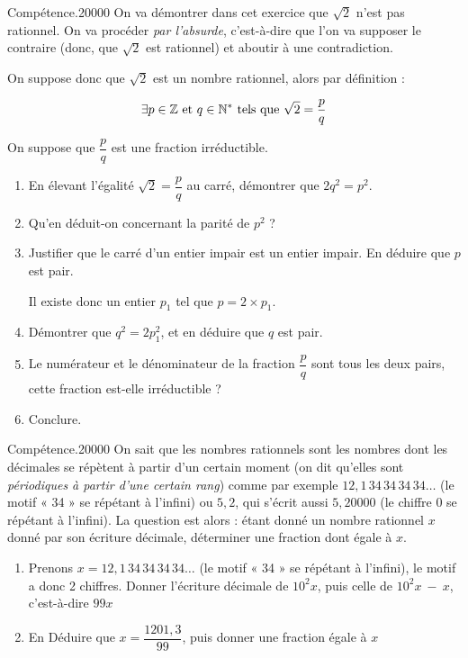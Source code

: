 \begin{pageParcoursd} %

\begin{ExoCdN}{Compétence.}{2}{0}{0}{0}{0}
On va démontrer dans cet exercice que $\sqrt 2$ n'est pas rationnel. On va procéder {\em
par l'absurde}, c'est-à-dire que l'on va supposer le contraire (donc, que $\sqrt 2$ est
rationnel) et aboutir à une contradiction.

On suppose donc que $\sqrt{2}$ est un nombre rationnel, alors par définition : 

\[\exists p\in\mathbb Z \text{ et }q\in\mathbb N^{\ast}\text{ tels que }\sqrt{2}=\dfrac{p}{q}\]

On suppose que $\dfrac{p}{q}$ est une fraction irréductible.

\begin{enumerate}
\item En élevant l'égalité $\sqrt{2}=\dfrac{p}{q}$ au carré, démontrer que $2q^2=p^2$.
\item Qu'en déduit-on concernant la parité de $p^2$ ?
\item Justifier que le carré d'un entier impair est un entier impair. En déduire que
$p$ est pair.

Il existe donc un entier $p_1$ tel que $p=2\times p_1$.
\item Démontrer que $q^2=2p_1^2$, et en déduire que $q$ est pair.
\item Le numérateur et le dénominateur de la fraction $\dfrac pq$ sont tous les deux
pairs, cette fraction est-elle irréductible ?
\item Conclure.
\end{enumerate}
\end{ExoCdN}



\begin{ExoCdN}{Compétence.}{2}{0}{0}{0}{0}
On sait que les nombres rationnels sont les nombres dont les décimales
se répètent à partir d'un certain moment (on dit qu'elles sont {\em périodiques à partir
d'une certain rang}) comme par exemple $12,1\,34\,34\,34\,34\ldots$ (le motif « 34 » se répétant
à l'infini) ou $5,2$, qui s'écrit aussi $5,20000$ (le chiffre 0 se répétant à l'infini). La question
est alors : étant donné un nombre rationnel $x$ donné par son écriture décimale, déterminer une fraction
dont égale à $x$.
\begin{enumerate}
\item Prenons $x=12,1\,34\,34\,34\,34\ldots$ (le motif « 34 » se répétant
à l'infini), le motif a donc 2 chiffres. Donner l'écriture décimale de $10^2x$, puis celle
de $10^2x~-~x$, c'est-à-dire $99x$
\item En Déduire que $x=\dfrac{1201,3}{99}$, puis donner une fraction égale à $x$ 
\end{enumerate}
\end{ExoCdN}


\end{pageParcoursd}
